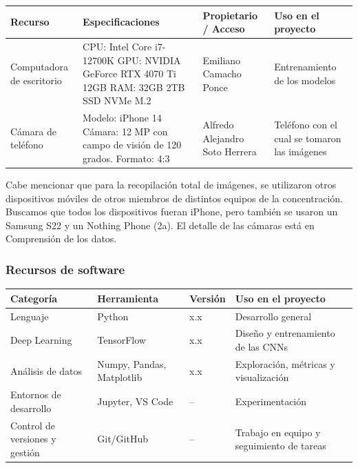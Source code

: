 \noindent
\begin{tabularx}{\textwidth}{>{\raggedright\arraybackslash}p{}>{\raggedright\arraybackslash}X>{\raggedright\arraybackslash}p{}>{\raggedright\arraybackslash}p{}}
  \toprule
  Recurso & Especificaciones & Propietario / Acceso & Uso en el proyecto \\
  \midrule
  Computadora de escritorio & CPU: Intel Core i7-12700K \newline GPU: NVIDIA GeForce RTX 4070 Ti 12GB \newline RAM: 32GB \newline 2TB SSD NVMe M.2 & Emiliano Camacho Ponce & Entrenamiento de los modelos \\
  \addlinespace
  Cámara de teléfono & Modelo: iPhone 14 \newline Cámara: 12 MP con campo de visión de 120 grados. \newline Formato: 4:3 & Alfredo Alejandro Soto Herrera & Teléfono con el cual se tomaron las imágenes \\
  \bottomrule
\end{tabularx}

\medskip
Cabe mencionar que para la recopilación total de imágenes, se utilizaron otros dispositivos móviles de otros miembros de distintos equipos de la concentración. Buscamos que todos los dispositivos fueran iPhone, pero también se usaron un Samsung S22 y un Nothing Phone (2a). El detalle de las cámaras está en Comprensión de los datos.

\subsubsection{Recursos de software}

\noindent
\begin{tabularx}{\textwidth}{>{\raggedright\arraybackslash}p{}>{\raggedright\arraybackslash}X>{\raggedright\arraybackslash}p{}>{\raggedright\arraybackslash}X}
  \toprule
  Categoría & Herramienta & Versión & Uso en el proyecto \\
  \midrule
  Lenguaje & Python & x.x & Desarrollo general \\
  \addlinespace
  Deep Learning & TensorFlow & x.x & Diseño y entrenamiento de las CNNs \\
  \addlinespace
  Análisis de datos & Numpy, Pandas, Matplotlib & x.x & Exploración, métricas y visualización \\
  \addlinespace
  Entornos de desarrollo & Jupyter, VS Code & -- & Experimentación \\
  \addlinespace
  Control de versiones y gestión & Git/GitHub & -- & Trabajo en equipo y seguimiento de tareas \\
  \bottomrule
\end{tabularx}
